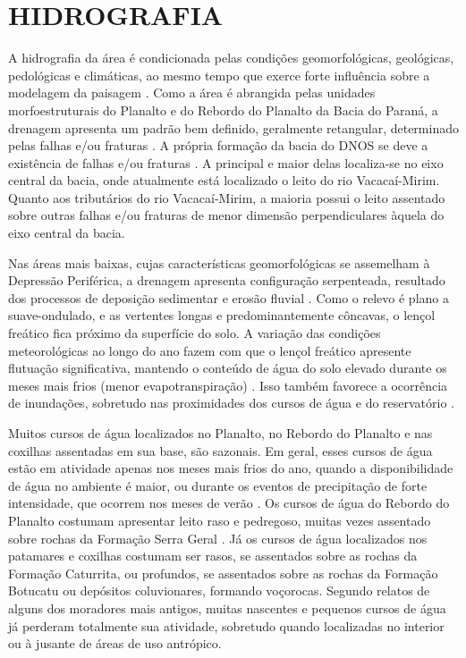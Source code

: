 \section{HIDROGRAFIA}
\label{sec:chap02-hidrografia}

A hidrografia da área é condicionada pelas condições geomorfológicas, geológicas, pedológicas e climáticas, ao 
mesmo tempo que exerce forte influência sobre a modelagem da paisagem \cite{NascimentoEtAl2010}. Como a área é 
abrangida pelas unidades morfoestruturais do Planalto e do Rebordo do Planalto da Bacia do Paraná, a drenagem 
apresenta um padrão bem definido, geralmente retangular, determinado pelas falhas e/ou fraturas 
\cite{Bortoluzzi1974, GasparettoEtAl1988, NascimentoEtAl2010}. A própria formação da bacia do DNOS se deve 
a existência de falhas e/ou fraturas \cite{GasparettoEtAl1988}. A principal e maior delas localiza-se no eixo 
central da bacia, onde atualmente está localizado o leito do rio Vacacaí-Mirim. Quanto aos tributários do rio 
Vacacaí-Mirim, a maioria possui o leito assentado sobre outras falhas e/ou fraturas de menor dimensão 
perpendiculares àquela do eixo central da bacia.

Nas áreas mais baixas, cujas características geomorfológicas se assemelham à Depressão Periférica, a drenagem 
apresenta configuração serpenteada, resultado dos processos de deposição sedimentar e erosão fluvial 
\cite{PaivaEtAl2001, SutiliEtAl2009}. Como o relevo é plano a suave-ondulado, e as vertentes longas e 
predominantemente côncavas, o lençol freático fica próximo da superfície do solo. A variação das condições 
meteorológicas ao longo do ano fazem com que o lençol freático apresente flutuação significativa, mantendo o 
conteúdo de água do solo elevado durante os meses mais frios (menor evapotranspiração) \cite{HeldweinEtAl2009}.
Isso também favorece a ocorrência de inundações, sobretudo nas proximidades dos cursos de água e do 
reservatório \cite{Goldani2006}.

Muitos cursos de água localizados no Planalto, no Rebordo do Planalto e nas coxilhas assentadas em sua base, 
são sazonais. Em geral, esses cursos de água estão em atividade apenas nos meses mais frios do ano, quando a 
disponibilidade de água no ambiente é maior, ou durante os eventos de precipitação de forte intensidade, que 
ocorrem nos meses de verão \cite{HeldweinEtAl2009, MouraBueno2012}. Os cursos de água do Rebordo do Planalto 
costumam apresentar leito raso e pedregoso, muitas vezes assentado sobre rochas da Formação Serra Geral 
\cite{SutiliEtAl2009}. Já os cursos de água localizados nos patamares e coxilhas costumam ser rasos, se 
assentados sobre as rochas da Formação Caturrita, ou profundos, se assentados sobre as rochas da Formação 
Botucatu ou depósitos coluvionares, formando voçorocas. Segundo relatos de alguns dos moradores mais antigos, 
muitas nascentes e pequenos cursos de água já perderam totalmente sua atividade, sobretudo quando localizadas 
no interior ou à jusante de áreas de uso antrópico.

